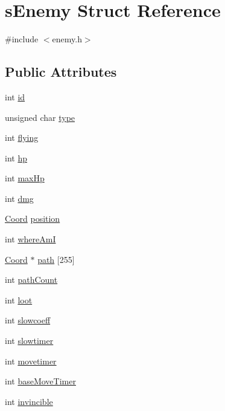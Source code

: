 \hypertarget{structs_enemy}{}\section{s\+Enemy Struct Reference}
\label{structs_enemy}


{\ttfamily \#include $<$enemy.\+h$>$}

\subsection*{Public Attributes}
\begin{DoxyCompactItemize}
\item 
int \hyperlink{structs_enemy_abe78ad5ba13cad652d467e4fdb5681ed}{id}
\item 
unsigned char \hyperlink{structs_enemy_a489802fdb01def60e2cca9b238887d02}{type}
\item 
int \hyperlink{structs_enemy_a3564672ff00ff59fafdd7b00b7c89eac}{flying}
\item 
int \hyperlink{structs_enemy_a1bd3cc9ffeda48c3b645bfc8e4e3bb02}{hp}
\item 
int \hyperlink{structs_enemy_a20e3715f8ceaecda0f69b78cc3788eae}{max\+Hp}
\item 
int \hyperlink{structs_enemy_ac469a015604c8a1206eaacb5a9de3fae}{dmg}
\item 
\hyperlink{coordonates_8h_aff9d4468ac7a973ce7e5cfb5bd39bc33}{Coord} \hyperlink{structs_enemy_a470b9c7b6aba2b0abe9a7421c07a3441}{position}
\item 
int \hyperlink{structs_enemy_aff7c9c05f34dce9562407d02737b6b57}{where\+Am\+I}
\item 
\hyperlink{coordonates_8h_aff9d4468ac7a973ce7e5cfb5bd39bc33}{Coord} $\ast$ \hyperlink{structs_enemy_af35d52de6ce3e791d5181581d5da23a4}{path} \mbox{[}255\mbox{]}
\item 
int \hyperlink{structs_enemy_a9988dd54e1c2d27537a3bccc673e7ec1}{path\+Count}
\item 
int \hyperlink{structs_enemy_ab9b3100bc2168b242a14447e055cee56}{loot}
\item 
int \hyperlink{structs_enemy_a201f8e838aa8f1c91c35fd6c92d5acf3}{slowcoeff}
\item 
int \hyperlink{structs_enemy_a288d3987c9819d3a37f33d3649a8f8f2}{slowtimer}
\item 
int \hyperlink{structs_enemy_a67061fc603f50fececb41b9dd6a269ad}{movetimer}
\item 
int \hyperlink{structs_enemy_aabc5707d86db96a7deca75934a8cb05f}{base\+Move\+Timer}
\item 
int \hyperlink{structs_enemy_ab28dbc0855768585087a8ffbd2da9ddf}{invincible}
\end{DoxyCompactItemize}


